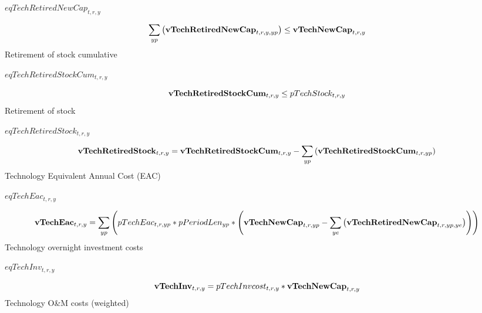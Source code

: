 \documentclass{article}
\begin{document}
$eqTechRetiredNewCap_{t,r,y}$





\begin{dmath}
\sum_{yp}{\left({\bf vTechRetiredNewCap}_{t,r,y,yp}\right)}  \le  {\bf vTechNewCap}_{t,r,y}
\end{dmath}
Retirement of stock cumulative







$eqTechRetiredStockCum_{t,r,y}$





\begin{dmath}
{\bf vTechRetiredStockCum}_{t,r,y}  \le  pTechStock_{t,r,y}
\end{dmath}
Retirement of stock







$eqTechRetiredStock_{t,r,y}$





\begin{dmath}
{\bf vTechRetiredStock}_{t,r,y}  =  {\bf vTechRetiredStockCum}_{t,r,y}-\sum_{yp}{\left({\bf vTechRetiredStockCum}_{t,r,yp}\right)}
\end{dmath}
Technology Equivalent Annual Cost (EAC)







$eqTechEac_{t,r,y}$





\begin{dmath}
{\bf vTechEac}_{t,r,y}  =  \sum_{yp}{\left(pTechEac_{t,r,yp}*pPeriodLen_{yp}*\left({\bf vTechNewCap}_{t,r,yp}-\sum_{ye}{\left({\bf vTechRetiredNewCap}_{t,r,yp,ye}\right)}\right)\right)}
\end{dmath}
Technology overnight investment costs







$eqTechInv_{t,r,y}$





\begin{dmath}
{\bf vTechInv}_{t,r,y}  =  pTechInvcost_{t,r,y}*{\bf vTechNewCap}_{t,r,y}
\end{dmath}
Technology O\&M costs (weighted)
\end{document}
